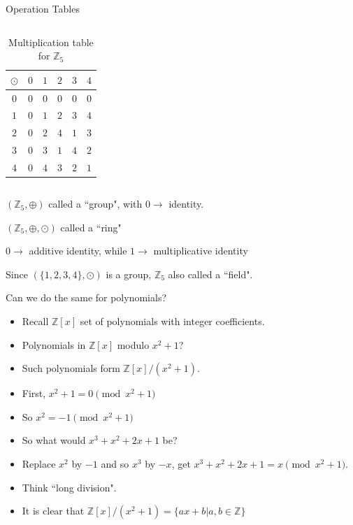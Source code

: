\documentclass[ %
usenames,dvipsnames,
aspectratio=169,11pt]{beamer}
\newenvironment{stepitemize}{\begin{itemize}[<+->]}{\end{itemize} }
\newcommand{\Z}{\mathbb{Z}}
\begin{document}
\begin{frame}{Operation Tables}
\begin{itemize}
{\begin{columns}
        \begin{column}{0.4\textwidth}
    \begin{table}
            \begin{tabular}{ c| c | c |c|c|c}
$\odot$  & $0$ & {\color{red}$1$} & {\color{red} $2$} & {\color{red}$3$}& {\color{red}$4$}\\
\hline
$0$ & $0$ & $0$ & $0$ & $0$& $0$ \\
\hline
{\color{red} $1$} & $0$ & {\color{red}$1$} & {\color{red}$2$} & {\color{red}$3$} & {\color{red}$4$} \\
\hline
{\color{red}$2$}& $0$ & {\color{red}$2$} &{\color{red}$4$} & {\color{red}$1$} & {\color{red} $3$}\\
\hline
{\color{red} $3$}& $0$ & {\color{red}$3$} &{\color{red}$1$} & {\color{red}$4$} & {\color{red}$2$}\\
\hline
{\color{red}$4$}& $0$ & {\color{red}$4$} & {\color{red}$3$} & {\color{red}$2$} & {\color{red}$1$}
\end{tabular}
\caption{Multiplication table for $\Z_5$}
\end{table}
    \end{column}
\end{columns}
\bigskip
 \item $(\Z_5,\oplus)$ called a ``group", with $0 \rightarrow$ identity.
   \item $(\Z_5, \oplus, \odot)$ called a ``ring"
   \item $0 \rightarrow$ additive identity, while $1\rightarrow$ multiplicative identity
    \item Since $(\{1,2,3,4\},\odot)$ is a group, $\Z_5$ also called a ``field".

  }

\end{itemize}

\end{frame}

\begin{frame}{Can we do the same for polynomials?}
    \begin{stepitemize}
    \item Recall $\Z[x]$ set of polynomials with integer coefficients.
    \item Polynomials in $\Z[x]$ modulo $x^2+1$?
    \item Such polynomials form $\Z[x]/(x^2+1)$.
    \item First, $x^2+1=0 \pmod{x^2+1}$
    \item So $x^2=-1 \pmod{x^2+1}$
    \item So what would $x^3+x^2+2x+1$ be?
    \item Replace $x^2$ by $-1$ and so $x^3$ by $-x$, get $x^3+x^2+2x+1 = x \pmod{x^2+1}$.
    \item Think ``long division".
    \item It is clear that
    $\Z[x]/(x^2+1) = \{ax+b|a, b\in \Z\}$
    \end{stepitemize}
\end{frame}
\end{document}
